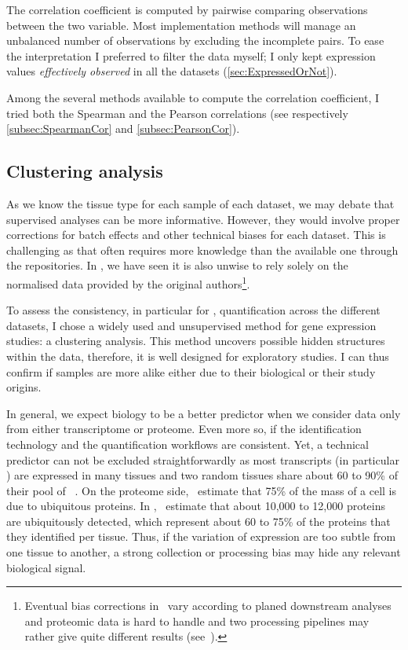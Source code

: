 The correlation coefficient is computed by pairwise comparing observations
between the two variable. Most implementation methods
will manage an unbalanced number of observations by excluding the incomplete pairs.
To ease the interpretation I preferred to filter the data 
myself; I only kept expression values \emph{effectively observed}
in all the datasets (\cref{sec:ExpressedOrNot}).

Among the several methods available to compute the correlation coefficient, I
tried both the Spearman and the Pearson correlations
(see respectively \cref{subsec:SpearmanCor} and \cref{subsec:PearsonCor}).

\subsection{Clustering analysis}

As we know the tissue type for each sample of each dataset,
we may debate that supervised analyses can be more informative.
However, they would involve proper corrections for batch effects and
other technical biases for each dataset.
This is challenging as that often requires more knowledge than the available one
through the repositories.
In , we have seen it is also unwise to rely solely on the
normalised data provided by the original authors\footnote{Eventual bias corrections
in \Rnaseq\ vary according to planed downstream analyses and
proteomic data is hard to handle and two processing pipelines may rather give
quite different results (see~).}.

To assess the consistency, in particular for \Rnaseq, quantification across
the different datasets, I chose a widely used and unsupervised method for gene
expression studies: a clustering analysis.
This method uncovers possible hidden
structures within the data, therefore,
it is well designed for exploratory studies.
I can thus confirm if samples are more alike either due to their
biological or their study origins.

In general, we expect biology to be a better predictor when we consider
data only from either transcriptome or proteome. Even more so, if the
identification technology and the quantification workflows are
consistent. Yet, a technical predictor can not be excluded straightforwardly
as most transcripts (in particular \mRNAs) are expressed in many tissues
and two random tissues share about 60 to 90\% of their pool of
\mRNAs~.
On the proteome side,~\cite{PandeyData}
estimate that 75\% of the mass of a cell is due to ubiquitous proteins.
In ,~\cite{KusterData} estimate that about 10,000
to 12,000 proteins are ubiquitously detected, which represent about 60 to 75\%
of the proteins that they identified per tissue. Thus, if the variation of
expression are too subtle from one tissue to another, a strong collection or
processing bias may hide any relevant biological signal.

